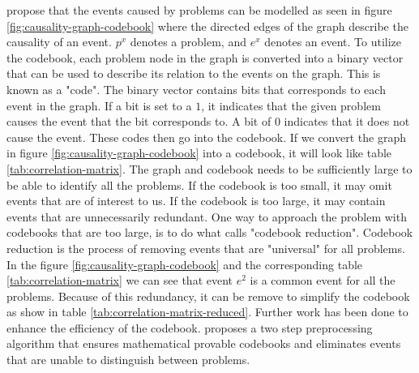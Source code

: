 \textcite{yemini_1996} propose that the events caused by problems can be modelled as seen in figure \ref{fig:causality-graph-codebook} where the directed edges of the graph describe the causality of an event. $p^x$ denotes a problem, and $e^x$ denotes an event. To utilize the codebook, each problem node in the graph is converted into a binary vector that can be used to describe its relation to the events on the graph. This is known as a "code". The binary vector contains bits that corresponds to each event in the graph. If a bit is set to a $1$, it indicates that the given problem causes the event that the bit corresponds to. A bit of $0$ indicates that it does not cause the event. These codes then go into the codebook. If we convert the graph in figure \ref{fig:causality-graph-codebook} into a codebook, it will look like table \ref{tab:correlation-matrix}. The graph and codebook needs to be sufficiently large to be able to identify all the problems. If the codebook is too small, it may omit events that are of interest to us. If the codebook is too large, it may contain events that are unnecessarily redundant. One way to approach the problem with codebooks that are too large, is to do what \textcite{yemini_1996} calls "codebook reduction". Codebook reduction is the process of removing events that are "universal" for all problems. In the figure \ref{fig:causality-graph-codebook} and the corresponding table \ref{tab:correlation-matrix} we can see that event $e^2$ is a common event for all the problems. Because of this redundancy, it can be remove to simplify the codebook as show in table \ref{tab:correlation-matrix-reduced}. Further work has been done to enhance the efficiency of the codebook. \textcite{gupta_1999} proposes a two step preprocessing algorithm that ensures mathematical provable codebooks and eliminates events that are unable to distinguish between problems.

